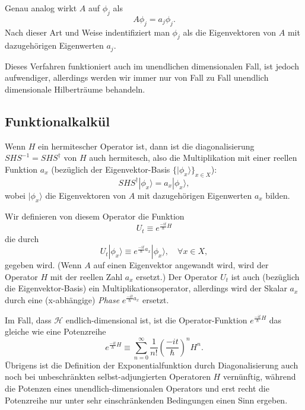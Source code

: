 Genau analog wirkt $A$ auf $\phi_j$ als
\begin{equation}
	A\phi_j = a_j\phi_j.
\end{equation}
Nach dieser Art und Weise indentifiziert man $\phi_j$ als die Eigenvektoren von $A$ mit dazugehörigen Eigenwerten $a_j$. 

Dieses Verfahren funktioniert auch im unendlichen dimensionalen Fall, ist jedoch aufwendiger, allerdings werden wir immer nur von Fall zu Fall unendlich dimensionale Hilberträume behandeln.

\subsection{Funktionalkalkül}
Wenn $H$ ein hermitescher Operator ist, dann ist die diagonalisierung $SHS^{-1} = SHS^{\dag}$ von $H$ auch hermitesch, also die Multiplikation mit einer reellen Funktion $a_x$ (bezüglich der Eigenvektor-Basis $\{|\phi_x\rangle\}_{x\in X}$):
\begin{equation}
	SHS^\dag |\phi_x\rangle = a_x |\phi_x\rangle,
\end{equation}
wobei $|\phi_x\rangle$ die Eigenvektoren von $A$ mit dazugehörigen Eigenwerten $a_x$ bilden. 

Wir definieren von diesem Operator die Funktion 
\begin{equation}
	U_t \equiv e^{\frac{−it}{\hbar}H}
\end{equation}
die durch
\begin{equation}
	U_t |\phi_x\rangle \equiv e^{\frac{−it}{\hbar}a_x} |\phi_x\rangle, \quad \forall x\in X,
\end{equation}
gegeben wird. (Wenn $A$ auf einen Eigenvektor angewandt wird, wird der Operator $H$ mit der reellen Zahl $a_x$ ersetzt.) Der Operator $U_t$ ist auch (bezüglich die Eigenvektor-Basis) ein Multiplikationsoperator, allerdings wird der Skalar $a_x$ durch eine (x-abhängige) \emph{Phase} $e^{\frac{−it}{\hbar}a_x}$ ersetzt. 

Im Fall, dass $\mathcal{H}$ endlich-dimensional ist, ist die Operator-Funktion $e^{\frac{−it}{\hbar}H}$ das gleiche wie eine Potenzreihe 
\begin{equation}
	e^{\frac{−it}{\hbar}H} \equiv \sum_{n=0}^\infty \frac{1}{n!} \left(\frac{−it}{\hbar}\right)^n H^n.
\end{equation}
Übrigens ist die Definition der Exponentialfunktion durch Diagonalisierung auch noch bei unbeschränkten selbst-adjungierten Operatoren $H$ vernünftig, während die Potenzen eines unendlich-dimensionalen Operators und erst recht die Potenzreihe nur unter sehr einschränkenden Bedingungen einen Sinn ergeben.